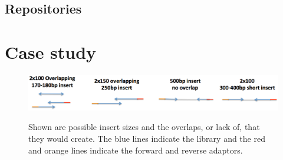 \documentclass[graybox]{svmult}
\begin{document}
\subsection{Repositories}
\label{sec:5repos}

\section{Case study}
\label{sec:6}

%

\begin{figure}[t]
\caption{Shown are possible insert sizes and the overlaps, or lack of, that they would create. The blue lines indicate the library and the red and orange lines indicate the forward and reverse adaptors.}
\includegraphics[scale=.35]{imgs/image1.eps}
%
\label{fig:1}       %
\end{figure}
\end{document}
